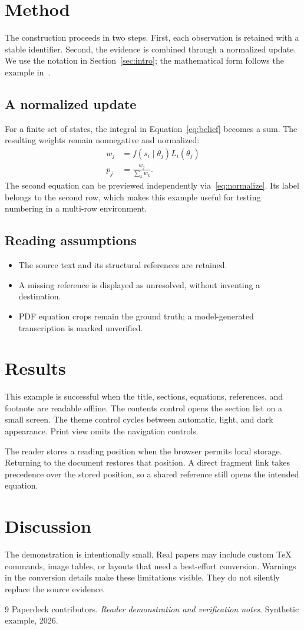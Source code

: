 \documentclass{article}
\begin{document}
\section{Method}\label{sec:method}
The construction proceeds in two steps. First, each observation is retained with a stable identifier. Second, the evidence is combined through a normalized update. We use the notation in Section~\ref{sec:intro}; the mathematical form follows the example in~\cite{example}.
\subsection{A normalized update}
For a finite set of states, the integral in Equation~\eqref{eq:belief} becomes a sum. The resulting weights remain nonnegative and normalized:
\begin{align}
 w_j &= f(s_i\mid\theta_j)L_i(\theta_j) \label{eq:weight}\\
 p_j &= \frac{w_j}{\sum_k w_k}. \label{eq:normalize}
\end{align}
The second equation can be previewed independently via~\eqref{eq:normalize}. Its label belongs to the second row, which makes this example useful for testing numbering in a multi-row environment.
\subsection{Reading assumptions}
\begin{itemize}
\item The source text and its structural references are retained.
\item A missing reference is displayed as unresolved, without inventing a destination.
\item PDF equation crops remain the ground truth; a model-generated transcription is marked unverified.
\end{itemize}
\section{Results}
This example is successful when the title, sections, equations, references, and footnote are readable offline. The contents control opens the section list on a small screen. The theme control cycles between automatic, light, and dark appearance. Print view omits the navigation controls.

The reader stores a reading position when the browser permits local storage. Returning to the document restores that position. A direct fragment link takes precedence over the stored position, so a shared reference still opens the intended equation.
\section{Discussion}
The demonstration is intentionally small. Real papers may include custom TeX commands, image tables, or layouts that need a best-effort conversion. Warnings in the conversion details make these limitations visible. They do not silently replace the source evidence.
\begin{thebibliography}{9}
 Paperdeck contributors. \emph{Reader demonstration and verification notes}. Synthetic example, 2026.
\end{thebibliography}
\end{document}
